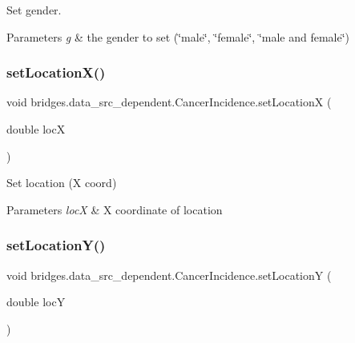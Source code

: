 Set gender. 


\begin{DoxyParams}{Parameters}
{\em g} & the gender to set (\char`\"{}male\char`\"{}, \char`\"{}female\char`\"{}, \char`\"{}male and female\char`\"{}) \\
\hline
\end{DoxyParams}
\mbox{\label{classbridges_1_1data__src__dependent_1_1_cancer_incidence_a384149c413173fba51adad1b1769797a}} 
\subsubsection{\texorpdfstring{setLocationX()}{setLocationX()}}
{\footnotesize\ttfamily void bridges.\+data\+\_\+src\+\_\+dependent.\+Cancer\+Incidence.\+set\+LocationX (\begin{DoxyParamCaption}\item[{double}]{locX }\end{DoxyParamCaption})}



Set location (X coord) 


\begin{DoxyParams}{Parameters}
{\em locX} & X coordinate of location \\
\hline
\end{DoxyParams}
\mbox{\label{classbridges_1_1data__src__dependent_1_1_cancer_incidence_a14c6921a71834c14d561bc7f2aa8a18e}} 
\subsubsection{\texorpdfstring{setLocationY()}{setLocationY()}}
{\footnotesize\ttfamily void bridges.\+data\+\_\+src\+\_\+dependent.\+Cancer\+Incidence.\+set\+LocationY (\begin{DoxyParamCaption}\item[{double}]{locY }\end{DoxyParamCaption})}



